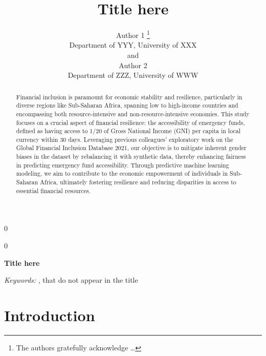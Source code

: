 \documentclass[12pt]{article}
\newcommand{\blind}{0}
\begin{document}
\def\spacingset#1{\renewcommand{\baselinestretch}%
{#1}\small\normalsize} \spacingset{1}



\blind
{
  \title{\bf Title here}

  \author{
        Author 1 \thanks{The authors gratefully acknowledge \ldots{}} \\
    Department of YYY, University of XXX\\
     and \\     Author 2 \\
    Department of ZZZ, University of WWW\\
      }
  \maketitle
} \fi

\blind
{
  \bigskip
  \bigskip
  \bigskip
  \begin{center}
    {\LARGE\bf Title here}
  \end{center}
  \medskip
} \fi

\bigskip
\begin{abstract}
Financial inclusion is paramount for economic stability and resilience,
particularly in diverse regions like Sub-Saharan Africa, spanning low to
high-income countries and encompassing both resource-intensive and
non-resource-intensive economies. This study focuses on a crucial aspect
of financial resilience: the accessibility of emergency funds, defined
as having access to 1/20 of Gross National Income (GNI) per capita in
local currency within 30 days. Leveraging previous colleagues'
exploratory work on the Global Financial Inclusion Database 2021, our
objective is to mitigate inherent gender biases in the dataset by
rebalancing it with synthetic data, thereby enhancing fairness in
predicting emergency fund accessibility. Through predictive machine
learning modeling, we aim to contribute to the economic empowerment of
individuals in Sub-Saharan Africa, ultimately fostering resilience and
reducing disparities in access to essential financial resources.
\end{abstract}

\noindent%
{\it Keywords:} , that do not appear in the title

\vfill

\newpage
\spacingset{1.9} %

\hypertarget{introduction}{%
\section{Introduction}\label{introduction}}
\end{document}
